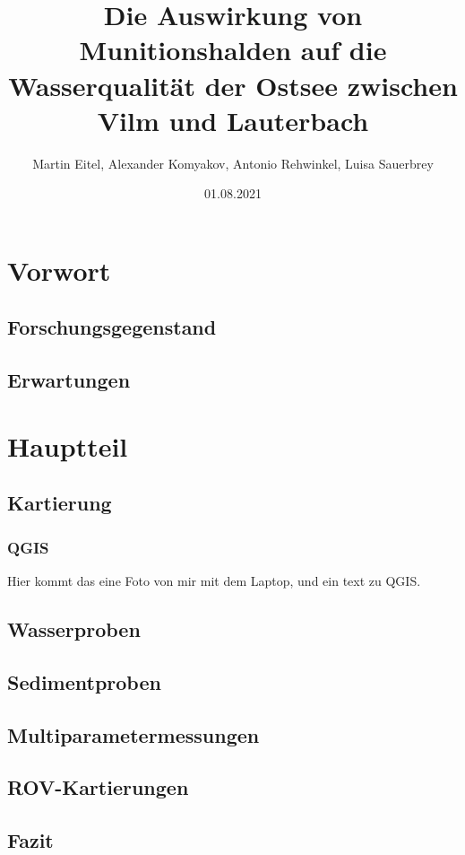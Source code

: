 \documentclass[12pt,titlepage]{scrbook}
\begin{document}
\begin{titlepage}
\title{Die Auswirkung von Munitionshalden auf die Wasserqualität der Ostsee zwischen Vilm und Lauterbach}
\date{01.08.2021}
\author{Martin Eitel, Alexander Komyakov, Antonio Rehwinkel, Luisa Sauerbrey}
\maketitle
\end{titlepage}
\tableofcontents
\chapter{Vorwort}
\section{Forschungsgegenstand}
\section{Erwartungen}
\chapter{Hauptteil}
\section{Kartierung}
    \subsection*{QGIS}
    Hier kommt das eine Foto von mir mit dem Laptop, und ein text zu QGIS.
\section{Wasserproben}
\section{Sedimentproben}
\section{Multiparametermessungen}
\section{ROV-Kartierungen}
\section{Fazit}
\end{document}
